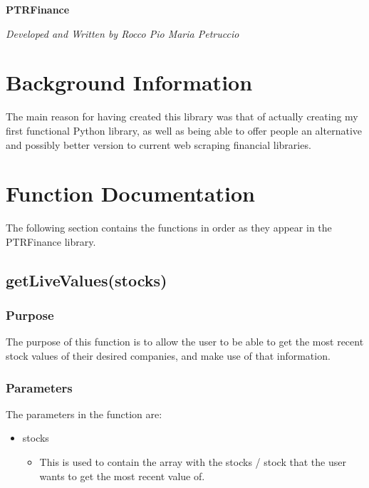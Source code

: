 \documentclass{article}
\begin{document}
	\begin{titlepage}
		\begin{center}
			\large
			\textbf{PTRFinance}
			
			\vspace{3cm}
			
			\normalsize
			\textit{Developed and Written by Rocco Pio Maria Petruccio}
		\end{center}
	\end{titlepage}
	
	\tableofcontents
	
	\newpage
	
	\section{Background Information}
		The main reason for having created this library was that of actually creating my first functional Python library, as well as being able to offer people an alternative and possibly better version to current web scraping financial libraries.
		
	\newpage
	
	\section{Function Documentation}
		The following section contains the functions in order as they appear in the PTRFinance library.
		
		\subsection{getLiveValues(stocks)}
			\subsubsection{Purpose}
				The purpose of this function is to allow the user to be able to get the most recent stock values of their desired companies, and make use of that information.
				
			\subsubsection{Parameters}
				The parameters in the function are:
					\begin{itemize}
						\item stocks
							\begin{itemize}
								\item This is used to contain the array with the stocks / stock that the user wants to get the most recent value of.
							\end{itemize}
					\end{itemize}
			
\end{document}
